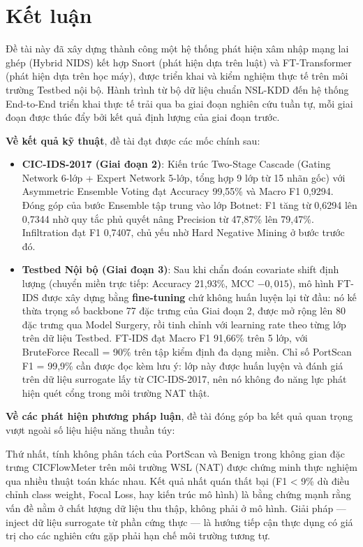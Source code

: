\documentclass[../DoAn.tex]{subfiles}
\begin{document}
\section*{Kết luận}
\label{sec:kl-ketluan}

Đề tài này đã xây dựng thành công một hệ thống phát hiện xâm nhập mạng lai ghép (Hybrid NIDS) kết hợp Snort (phát hiện dựa trên luật) và FT-Transformer (phát hiện dựa trên học máy), được triển khai và kiểm nghiệm thực tế trên môi trường Testbed nội bộ. Hành trình từ bộ dữ liệu chuẩn NSL-KDD đến hệ thống End-to-End triển khai thực tế trải qua ba giai đoạn nghiên cứu tuần tự, mỗi giai đoạn được thúc đẩy bởi kết quả định lượng của giai đoạn trước.

\textbf{Về kết quả kỹ thuật}, đề tài đạt được các mốc chính sau:

\begin{itemize}
    \item \textbf{CIC-IDS-2017 (Giai đoạn 2)}: Kiến trúc Two-Stage Cascade (Gating Network 6-lớp + Expert Network 5-lớp, tổng hợp 9 lớp từ 15 nhãn gốc) với Asymmetric Ensemble Voting đạt Accuracy 99,55\% và Macro F1 0,9294. Đóng góp của bước Ensemble tập trung vào lớp Botnet: F1 tăng từ 0,6294 lên 0,7344 nhờ quy tắc phủ quyết nâng Precision từ 47,87\% lên 79,47\%. Infiltration đạt F1 0,7407, chủ yếu nhờ Hard Negative Mining ở bước trước đó.

    \item \textbf{Testbed Nội bộ (Giai đoạn 3)}: Sau khi chẩn đoán covariate shift định lượng (chuyển miền trực tiếp: Accuracy 21,93\%, MCC $-0{,}015$), mô hình FT-IDS được xây dựng bằng \textbf{fine-tuning} chứ không huấn luyện lại từ đầu: nó kế thừa trọng số backbone 77 đặc trưng của Giai đoạn 2, được mở rộng lên 80 đặc trưng qua Model Surgery, rồi tinh chỉnh với learning rate theo từng lớp trên dữ liệu Testbed. FT-IDS đạt Macro F1 91,66\% trên 5 lớp, với BruteForce Recall = 90\% trên tập kiểm định đa dạng miền. Chỉ số PortScan F1 = 99,9\% cần được đọc kèm lưu ý: lớp này được huấn luyện và đánh giá trên dữ liệu surrogate lấy từ CIC-IDS-2017, nên nó không đo năng lực phát hiện quét cổng trong môi trường NAT thật.
\end{itemize}

\textbf{Về các phát hiện phương pháp luận}, đề tài đóng góp ba kết quả quan trọng vượt ngoài số liệu hiệu năng thuần túy:

Thứ nhất, tính không phân tách của PortScan và Benign trong không gian đặc trưng CICFlowMeter trên môi trường WSL (NAT) được chứng minh thực nghiệm qua nhiều thuật toán khác nhau. Kết quả nhất quán thất bại (F1 < 9\% dù điều chỉnh class weight, Focal Loss, hay kiến trúc mô hình) là bằng chứng mạnh rằng vấn đề nằm ở chất lượng dữ liệu thu thập, không phải ở mô hình. Giải pháp --- inject dữ liệu surrogate từ phần cứng thực --- là hướng tiếp cận thực dụng có giá trị cho các nghiên cứu gặp phải hạn chế môi trường tương tự.
\end{document}
